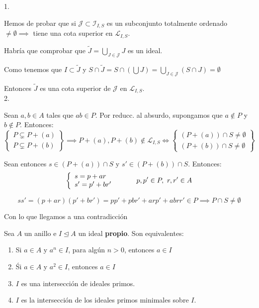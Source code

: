 \documentclass[openany]{book}
\begin{document}
\begin{demonstration}
    1.

    Hemos de probar que si $ \mathcal{J} \subset \mathcal{I}_{I,S}  $ es un subconjunto totalmente ordenado $ \ne \emptyset \implies $ tiene una cota superior en $ \mathcal{L}_{I,S} $.
    
    Habría que comprobar que $ \widetilde{J} = \bigcup_{J \in \mathcal{J}}J $ es un ideal.

    Como tenemos que $ I \subset  \widetilde{J} $ y $ S \cap \widetilde{J} = S \cap (\bigcup J) = \bigcup_{J \in \mathcal{J}} (S\cap J) = \emptyset $

    Entonces $ \widetilde{J} $ es una cota superior de $ \mathcal{J} $ en $ \mathcal{L}_{I,S} $.\\
    2.

    Sean $ a,b \in A $ tales que $ ab \in P $. Por reducc. al absurdo, supongamos que $ a \not \in P $ y $ b \not \in P $. Entonces:
    $$ \left\{
    \begin{array}{l}
        P \subsetneq P + (a)\\
        P \subsetneq P + (b)
    \end{array}
    \right\} \implies P+(a),P+(b) \not \in \mathcal{L}_{I,S} \iff \left\{
    \begin{array}{l}
        (P+(a)) \cap S \ne \emptyset\\
        (P+(b)) \cap S \ne \emptyset
    \end{array}
    \right\} $$

    Sean entonces $ s \in (P+(a)) \cap S  $ y $ s' \in (P+(b))\cap S $. Entonces:
    $$ \left\{
    \begin{array}{l}
        s = p+ar\\
        s'=p'+br'
    \end{array}
    \right.\hspace{10mm} p,p' \in P,\ r,r' \in A $$

    $$ ss' = (p+ar)(p'+br') = pp'+pbr' + arp' + abrr' \in P \implies P \cap S \ne \emptyset $$

    Con lo que llegamos a una contradicción
\end{demonstration}


\begin{proposition}
    Sea $ A  $ un anillo e $ I \unlhd A $ un ideal \textbf{propio}. Son equivalentes:
    \begin{enumerate}
        \item Si $ a \in A $ y $ a^{n} \in I $, para algún $ n>0 $, entonces $ a \in I $
        \item Śi $ a \in A $ y $ a^2 \in I $, entonces $ a \in I $
        \item $ I $ es una intersección de ideales primos.
        \item $ I $ es la intersección de los ideales primos minimales sobre $ I $.
    \end{enumerate}

\end{proposition}
\end{document}
